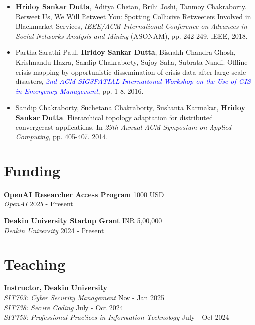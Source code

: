 \documentclass[margin, centered,lmodern]{res}
\begin{document}
\begin{resume}
\begin{itemize}[leftmargin=*]
\item \textbf{Hridoy Sankar Dutta}, Aditya Chetan, Brihi Joshi, Tanmoy Chakraborty. Retweet Us, We Will Retweet You: Spotting Collusive Retweeters Involved in Blackmarket Services, \textit{IEEE/ACM International Conference on Advances in Social Networks Analysis and Mining} (ASONAM), pp. 242-249. IEEE, 2018.

\item Partha Sarathi Paul, \textbf{Hridoy Sankar Dutta}, Bishakh Chandra Ghosh, Krishnandu Hazra, Sandip Chakraborty, Sujoy Saha, Subrata Nandi. Offline crisis mapping by opportunistic dissemination of crisis data after large-scale disasters, \textit{\textcolor{blue}{2nd ACM SIGSPATIAL International Workshop on the Use of GIS in Emergency Management}}, pp. 1-8. 2016.

\item Sandip Chakraborty, Suchetana Chakraborty, Sushanta Karmakar, \textbf{Hridoy Sankar Dutta}. Hierarchical topology adaptation for distributed convergecast applications, In \textit{29th Annual ACM Symposium on Applied Computing}, pp. 405-407. 2014.\end{itemize}

\section{Funding}
\textbf{OpenAI Researcher Access Program} \hfill 1000 USD  \\
\emph{OpenAI} \hfill 2025 - Present

\textbf{Deakin University Startup Grant} \hfill INR 5,00,000  \\
\emph{Deakin University} \hfill 2024 - Present

\section{Teaching}
\textbf{Instructor,  Deakin University} \\
\emph{SIT763: Cyber Security Management} \hfill Nov - Jan 2025 \\
\emph{SIT738: Secure Coding} \hfill July - Oct 2024 \\
\emph{SIT753: Professional Practices in Information Technology} \hfill July - Oct 2024 


\end{resume}
\end{document}
